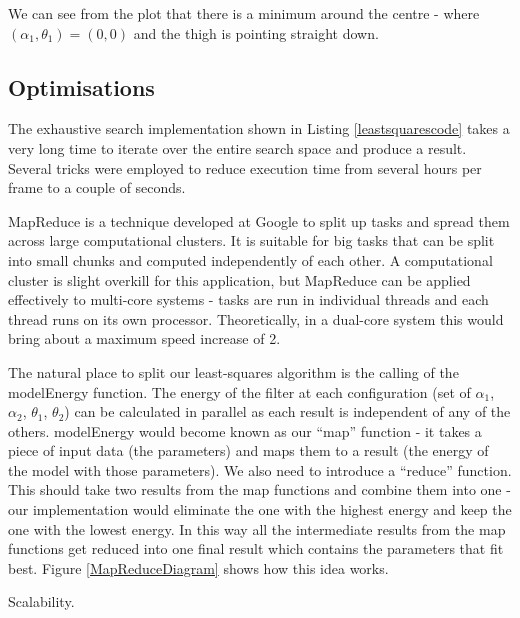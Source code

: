 We can see from the plot that there is a minimum around the centre - where $(\alpha_1, \theta_1) = (0, 0)$ and the thigh is pointing straight down.

\subsection{Optimisations}

The exhaustive search implementation shown in Listing \ref{leastsquarescode} takes a very long time to iterate over the entire search space and produce a result.
Several tricks were employed to reduce execution time from several hours per frame to a couple of seconds.

\bigskip
\noindent MapReduce \cite{MapReduce} is a technique developed at Google to split up tasks and spread them across large computational clusters.
It is suitable for big tasks that can be split into small chunks and computed independently of each other.
A computational cluster is slight overkill for this application, but MapReduce can be applied effectively to multi-core systems - tasks are run in individual threads and each thread runs on its own processor.
Theoretically, in a dual-core system this would bring about a maximum speed increase of 2.

The natural place to split our least-squares algorithm is the calling of the modelEnergy function.
The energy of the filter at each configuration (set of $\alpha_1$, $\alpha_2$, $\theta_1$, $\theta_2$) can be calculated in parallel as each result is independent of any of the others.
modelEnergy would become known as our ``map'' function - it takes a piece of input data (the parameters) and maps them to a result (the energy of the model with those parameters).
We also need to introduce a ``reduce'' function.
This should take two results from the map functions and combine them into one - our implementation would eliminate the one with the highest energy and keep the one with the lowest energy.
In this way all the intermediate results from the map functions get reduced into one final result which contains the parameters that fit best.
Figure \ref{MapReduceDiagram} shows how this idea works.

Scalability.

